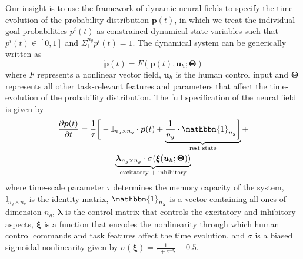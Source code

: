\documentclass[natbib, twocolumn]{svjour3}          %
\begin{document}
Our insight is to use the framework of dynamic neural fields to specify the time evolution of the probability distribution $\boldsymbol{p}(t)$, in which we treat the individual goal probabilities $p^i(t)$ as constrained dynamical state variables such that $p^i(t) \in [0, 1]$ and $\Sigma_{1}^{n_g}p^{i}(t) = 1$. The dynamical system can be generically written as 
\begin{equation*}
\dot{\boldsymbol{p}}(t) = F(\boldsymbol{p}(t), \boldsymbol{u}_h ; \boldsymbol{\Theta})
\end{equation*}
where $F$ represents a nonlinear vector field, $\boldsymbol{u}_h$ is the human control input and $\boldsymbol{\Theta}$ represents all other task-relevant features and parameters that affect the time-evolution of the probability distribution. 
The full specification of the neural field is given by
\begin{multline}\label{eq:dft}
\frac{\partial \boldsymbol{p}(t)}{\partial t} = \frac{1}{\tau}\bigg[-\mathbb{I}_{n_g\times n_g}\cdot\boldsymbol{p}(t) + \underbrace{\frac{1}{n_g}\cdot\mathbbm{1}_{n_g}\bigg]}_{\text{rest state}} + \\ \underbrace{\boldsymbol{\lambda}_{n_g\times n_g}\cdot\sigma(\boldsymbol{\xi}(\boldsymbol{u}_h;\boldsymbol{\Theta}))}_{\text{excitatory + inhibitory}}
\end{multline}
where time-scale parameter $\tau$ determines the memory capacity of the system, $\mathbb{I}_{n_g\times n_g}$ is the identity matrix, $\mathbbm{1}_{n_g}$ is a vector containing all ones of dimension $n_g$, $\boldsymbol{\lambda}$ is the control matrix that controls the excitatory and inhibitory aspects, $\boldsymbol{\xi}$ is a function that encodes the nonlinearity through which human control commands and task features affect the time evolution, and $\sigma$ is a biased sigmoidal nonlinearity given by $\sigma(\boldsymbol{\xi}) = \frac{1}{1 + e^{-\boldsymbol{\xi}}} - 0.5$.
\end{document}
